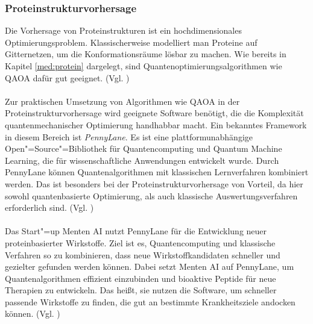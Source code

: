 
\subsubsection*{Proteinstrukturvorhersage}
Die Vorhersage von Proteinstrukturen ist ein hochdimensionales Optimierungsproblem. Klassischerweise modelliert man Proteine auf Gitternetzen, um die Konformationsräume lösbar zu machen. Wie bereits in Kapitel \ref{med:protein} dargelegt, sind Quantenoptimierungsalgorithmen wie QAOA dafür gut geeignet. (Vgl. \cite{boulebnane_peptide_2023})\\
\\
Zur praktischen Umsetzung von Algorithmen wie QAOA in der Proteinstrukturvorhersage wird geeignete Software benötigt, die die Komplexität quantenmechanischer Optimierung handhabbar macht. Ein bekanntes Framework in diesem Bereich ist \textit{PennyLane}. Es ist eine plattformunabhängige Open"=Source"=Bibliothek für Quantencomputing und Quantum Machine Learning, die für wissenschaftliche Anwendungen entwickelt wurde. Durch PennyLane können Quantenalgorithmen mit klassischen Lernverfahren kombiniert werden. Das ist besonders bei der Proteinstrukturvorhersage von Vorteil, da hier sowohl quantenbasierte Optimierung, als auch klassische Auswertungsverfahren erforderlich sind. (Vgl. \cite{noauthor_what_nodate})\\
\\
Das Start"=up Menten AI nutzt PennyLane für die Entwicklung neuer proteinbasierter Wirkstoffe. Ziel ist es, Quantencomputing und klassische Verfahren so zu kombinieren, dass neue Wirkstoffkandidaten schneller und gezielter gefunden werden können. Dabei setzt Menten AI auf PennyLane, um Quantenalgorithmen effizient einzubinden und bioaktive Peptide für neue Therapien zu entwickeln. Das heißt, sie nutzen die Software, um schneller passende Wirkstoffe zu finden, die gut an bestimmte Krankheitsziele andocken können. (Vgl. \cite{noauthor_xanadu_nodate})\\

